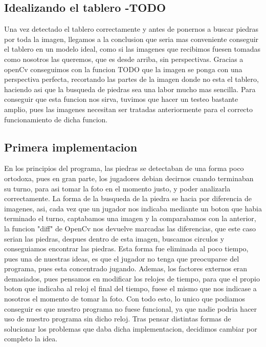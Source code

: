 \documentclass[12pt,a4paper]{report}
\begin{document}
\subsection{Idealizando el tablero -TODO}

Una vez detectado el tablero correctamente y antes de ponernos a buscar piedras por toda la imagen, llegamos a la conclusion que seria mas conveniente conseguir el tablero en un modelo ideal, como si las imagenes que recibimos fuesen tomadas como nosotros las queremos, que es desde arriba, sin perspectivas. 
Gracias a openCv conseguimos con la funcion TODO que la imagen se ponga con una perspectiva perfecta, recortando las partes de la imagen donde no esta el tablero, haciendo asi que la busqueda de piedras sea una labor mucho mas sencilla. 
Para conseguir que esta funcion nos sirva, tuvimos que hacer un testeo bastante amplio, pues las imagenes necesitan ser tratadas anteriormente para el correcto funcionamiento de dicha funcion.

\subsection{Primera implementacion}

En los principios del programa, las piedras se detectaban de una forma poco ortodoxa, pues en gran parte, los jugadores debian decirnos cuando terminaban su turno, para asi tomar la foto en el momento justo, y poder analizarla correctamente.
La forma de la busqueda de la piedra se hacia por diferencia de imagenes, asi, cada vez que un jugador nos indicaba mediante un boton que habia terminado el turno, captabamos una imagen y la comparabamos con la anterior, la funcion "diff" de OpenCv nos devuelve marcadas las diferencias, que este caso serian las piedras, despues dentro de esta imagen, buscamos circulos y conseguiamos encontrar las piedras. 
Esta forma fue eliminada al poco tiempo, pues una de nuestras ideas, es que el jugador no tenga que preocuparse del programa, pues esta concentrado jugando. Ademas, los factores externos eran demasiados, pues pensamos en modificar los relojes de tiempo, para que el propio boton que indicaba al reloj el final del tiempo, fuese el mismo que nos indicase a nosotros el momento de tomar la foto. Con todo esto, lo unico que podiamos conseguir es que nuestro programa no fuese funcional, ya que nadie podria hacer uso de nuestro programa sin dicho reloj. Tras pensar distintas formas de solucionar los problemas que daba dicha implementacion, decidimos cambiar por completo la idea.
\end{document}
